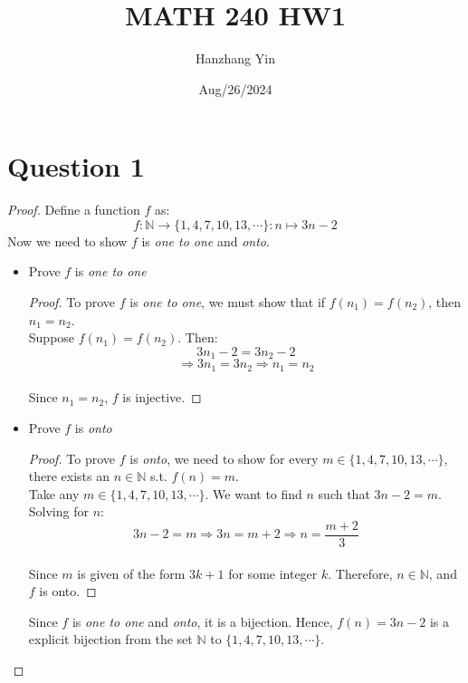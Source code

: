 \documentclass{article}
\title{MATH 240 HW1}
\author{Hanzhang Yin}
\date{Aug/26/2024}
\begin{document}
\maketitle

\section*{Question 1}
\begin{proof}
    Define a function $f$ as:
    \[ f: \mathbb{N} \rightarrow \{1,4,7,10,13,\cdots\}: n \mapsto 3n-2 \]
    Now we need to show $f$ is \textit{one to one} and \textit{onto}.
    \begin{itemize}
        \item Prove $f$ is \textit{one to one}
        \begin{proof}
            To prove $f$ is \textit{one to one}, we must show that if $f(n_1) = f(n_2)$, then $n_1 = n_2$.
            \\
            Suppose $f(n_1) = f(n_2)$. Then:
            \[ 3n_1 - 2 = 3n_2 - 2 \]
            \[ \Rightarrow 3n_1 = 3n_2 \Rightarrow n_1 = n_2\]
            \\
            Since $n_1 = n_2$, $f$ is injective.
        \end{proof}
        \item Prove $f$ is \textit{onto}
        \begin{proof}
            To prove $f$ is \textit{onto}, we need to show for every $m \in \{1,4,7,10,13,\cdots\}$, there exists an $n \in \mathbb{N}$ s.t. $f(n) = m$.
            \\
            Take any $m \in \{1,4,7,10,13,\cdots\}$. We want to find $n$ such that $3n-2 = m$. Solving for $n$:
            \[ 3n-2 = m \Rightarrow 3n = m + 2 \Rightarrow n = \frac{m+2}{3} \]
            \\
            Since $m$ is given of the form $3k+1$ for some integer $k$. Therefore, $n \in \mathbb{N}$, and $f$ is onto.
        \end{proof}
        Since $f$ is \textit{one to one} and \textit{onto}, it is a bijection. Hence, $f(n) = 3n - 2$ is a explicit bijection from the set $\mathbb{N}$ to $\{1,4,7,10,13,\cdots\}$.
    \end{itemize}
\end{proof}
\end{document}
